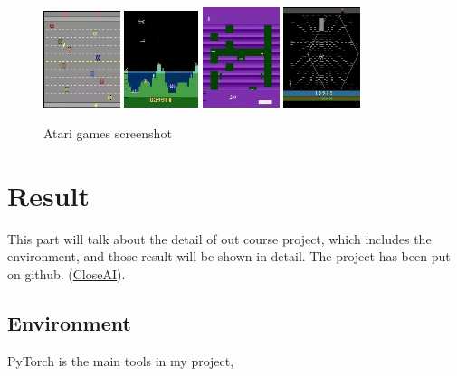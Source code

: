 \documentclass{article}
\begin{document}
\begin{figure}[H]
\centering
\includegraphics[width=0.2\textwidth]{img/Freeway.jpg}
\includegraphics[width=0.193\textwidth]{img/Atlantis.jpg}
\includegraphics[width=0.2\textwidth]{img/Tu.jpg}
\includegraphics[width=0.2\textwidth]{img/Krull.jpg}
\caption{Atari games screenshot}
\label{Fig.main2}
\end{figure}

\section{Result}
This part will talk about the detail of out course project,
which includes the environment, and those result will
be shown in detail. The project has been put on github. (\href{https://github.com/cla7aye15I4nd/CloseAI}{CloseAI}).
\subsection{Environment}
PyTorch is the main tools in my project, 
\end{document}
